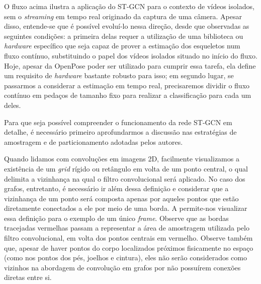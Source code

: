 O fluxo acima ilustra a aplicação do ST-GCN para o contexto de vídeos isolados, sem o \textit{streaming} em tempo real originado da captura de uma câmera. Apesar disso, entende-se que é possível evoluí-lo nessa direção, desde que observadas as seguintes condições: a primeira delas requer a utilização de uma biblioteca ou \textit{hardware} específico que seja capaz de prover a estimação dos esqueletos num fluxo contínuo, substituindo o papel dos vídeos isolados situado no início do fluxo. Hoje, apesar da OpenPose poder ser utilizado para cumprir essa tarefa, ela define um requisito de \textit{hardware} bastante robusto para isso; em segundo lugar, se passarmos a considerar a estimação em tempo real, precisaremos dividir o fluxo contínuo em pedaços de tamanho fixo para realizar a classificação para cada um deles.




Para que seja possível compreender o funcionamento da rede ST-GCN em detalhe, é necessário primeiro aprofundarmos a discussão nas estratégias de amostragem e de particionamento adotadas pelos autores. 

Quando lidamos com convoluções em imagens 2D, facilmente visualizamos a existência de um \textit{grid} rígido ou retângulo em volta de um ponto central, o qual delimita a vizinhança na qual o filtro convolucional será aplicado. No caso dos grafos, entretanto, é necessário ir além dessa definição e considerar que a vizinhança de um ponto será composta apenas por aqueles pontos que estão diretamente conectados a ele por meio de uma borda. A  permite-nos visualizar essa definição para o exemplo de um único \textit{frame}. Observe que as bordas tracejadas vermelhas passam a representar a área de amostragem utilizada pelo filtro convolucional, em volta dos pontos centrais em vermelho. Observe também que, apesar de haver pontos do corpo localizados próximos fisicamente no espaço (como nos pontos dos pés, joelhos e cintura), eles não serão considerados como vizinhos na abordagem de convolução em grafos por não possuírem conexões diretas entre si.

